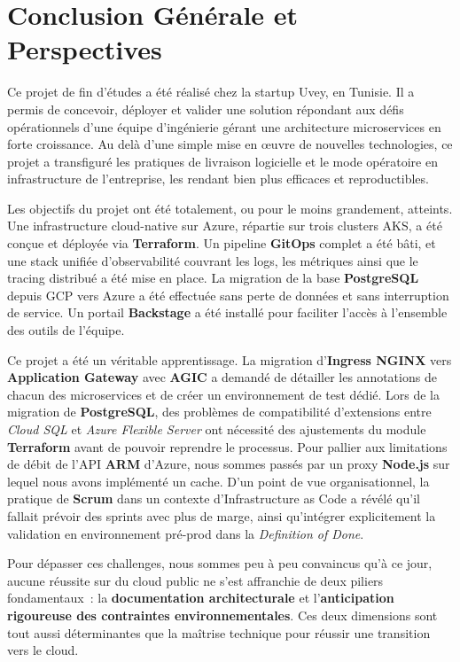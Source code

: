 \chapter*{Conclusion Générale et Perspectives}
\label{chap:conclusion}

\noindent Ce projet de fin d'études a été réalisé chez la startup Uvey, en Tunisie. Il a
permis de concevoir, déployer et valider une solution répondant aux défis opérationnels
d'une équipe d'ingénierie gérant une architecture microservices en forte croissance. Au
delà d'une simple mise en œuvre de nouvelles technologies, ce projet a transfiguré les
pratiques de livraison logicielle et le mode opératoire en infrastructure de l'entreprise,
les rendant bien plus efficaces et reproductibles.

\medskip
\noindent Les objectifs du projet ont été totalement, ou pour le moins grandement,
atteints. Une infrastructure cloud-native sur Azure, répartie sur trois clusters \ac{AKS},
a été conçue et déployée via \textbf{Terraform}. Un pipeline \textbf{GitOps} complet a
été bâti, et une stack unifiée d'observabilité couvrant les logs, les métriques ainsi que
le tracing distribué a été mise en place. La migration de la base \textbf{PostgreSQL}
depuis \ac{GCP} vers Azure a été effectuée sans perte de données et sans interruption de
service. Un portail \textbf{Backstage} a été installé pour faciliter l'accès à l'ensemble
des outils de l'équipe.
\medskip

\noindent Ce projet a été un véritable apprentissage. La migration d'\textbf{Ingress NGINX}
vers \textbf{Application Gateway} avec \textbf{AGIC} a demandé de détailler les
annotations de chacun des microservices et de créer un environnement de test dédié. Lors
de la migration de \textbf{PostgreSQL}, des problèmes de compatibilité d'extensions entre
\textit{Cloud SQL} et \textit{Azure Flexible Server} ont nécessité des ajustements du
module \textbf{Terraform} avant de pouvoir reprendre le processus. Pour pallier aux
limitations de débit de l'API \textbf{ARM} d'Azure, nous sommes passés par un proxy
\textbf{Node.js} sur lequel nous avons implémenté un cache. D'un point de vue
organisationnel, la pratique de \textbf{Scrum} dans un contexte d'Infrastructure as Code
a révélé qu'il fallait prévoir des sprints avec plus de marge, ainsi qu'intégrer
explicitement la validation en environnement pré-prod dans la \textit{Definition of Done}.

\medskip
\noindent Pour dépasser ces challenges, nous sommes peu à peu convaincus qu'à ce jour,
aucune réussite sur du cloud public ne s'est affranchie de deux piliers fondamentaux~:
la \textbf{documentation architecturale} et l'\textbf{anticipation rigoureuse des
contraintes environnementales}. Ces deux dimensions sont tout aussi déterminantes que la
maîtrise technique pour réussir une transition vers le cloud.

